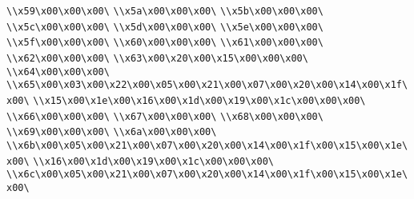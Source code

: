 \verb|\\x59\x00\x00\x00\|\newline
\verb|\\x5a\x00\x00\x00\|\newline
\verb|\\x5b\x00\x00\x00\|\newline
\verb|\\x5c\x00\x00\x00\|\newline
\verb|\\x5d\x00\x00\x00\|\newline
\verb|\\x5e\x00\x00\x00\|\newline
\verb|\\x5f\x00\x00\x00\|\newline
\verb|\\x60\x00\x00\x00\|\newline
\verb|\\x61\x00\x00\x00\|\newline
\verb|\\x62\x00\x00\x00\|\newline
\verb|\\x63\x00\x20\x00\x15\x00\x00\x00\|\newline
\verb|\\x64\x00\x00\x00\|\newline
\verb|\\x65\x00\x03\x00\x22\x00\x05\x00\x21\x00\x07\x00\x20\x00\x14\x00\x1f\x00\|\newline
\verb|\\x15\x00\x1e\x00\x16\x00\x1d\x00\x19\x00\x1c\x00\x00\x00\|\newline
\verb|\\x66\x00\x00\x00\|\newline
\verb|\\x67\x00\x00\x00\|\newline
\verb|\\x68\x00\x00\x00\|\newline
\verb|\\x69\x00\x00\x00\|\newline
\verb|\\x6a\x00\x00\x00\|\newline
\verb|\\x6b\x00\x05\x00\x21\x00\x07\x00\x20\x00\x14\x00\x1f\x00\x15\x00\x1e\x00\|\newline
\verb|\\x16\x00\x1d\x00\x19\x00\x1c\x00\x00\x00\|\newline
\verb|\\x6c\x00\x05\x00\x21\x00\x07\x00\x20\x00\x14\x00\x1f\x00\x15\x00\x1e\x00\|\newline
